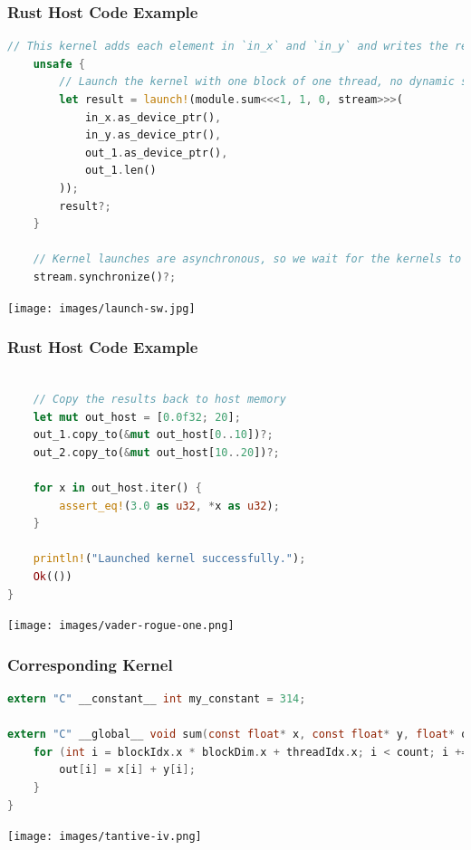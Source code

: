 \begin{frame}[fragile]
\frametitle{Rust Host Code Example}
\begin{lstlisting}[language=Rust]
    // This kernel adds each element in `in_x` and `in_y` and writes the result into `out`.
    unsafe {
        // Launch the kernel with one block of one thread, no dynamic shared memory on `stream`.
        let result = launch!(module.sum<<<1, 1, 0, stream>>>(
            in_x.as_device_ptr(),
            in_y.as_device_ptr(),
            out_1.as_device_ptr(),
            out_1.len()
        ));
        result?;
    }

    // Kernel launches are asynchronous, so we wait for the kernels to finish executing.
    stream.synchronize()?;
\end{lstlisting}

\begin{center}
	\texttt{[image: images/launch-sw.jpg]}
\end{center}

\end{frame}


\begin{frame}[fragile]
\frametitle{Rust Host Code Example}
\begin{lstlisting}[language=Rust]

    // Copy the results back to host memory
    let mut out_host = [0.0f32; 20];
    out_1.copy_to(&mut out_host[0..10])?;
    out_2.copy_to(&mut out_host[10..20])?;

    for x in out_host.iter() {
        assert_eq!(3.0 as u32, *x as u32);
    }

    println!("Launched kernel successfully.");
    Ok(())
}
\end{lstlisting}
\vspace{-1em}
\begin{center}
	\texttt{[image: images/vader-rogue-one.png]}
\end{center}

\end{frame}


\begin{frame}[fragile]
\frametitle{Corresponding Kernel}

\begin{lstlisting}[language=C]
extern "C" __constant__ int my_constant = 314;

extern "C" __global__ void sum(const float* x, const float* y, float* out, int count) {
    for (int i = blockIdx.x * blockDim.x + threadIdx.x; i < count; i += blockDim.x * gridDim.x) {
        out[i] = x[i] + y[i];
    }
}
\end{lstlisting}


\begin{center}
	\texttt{[image: images/tantive-iv.png]}
\end{center}
\end{frame}

